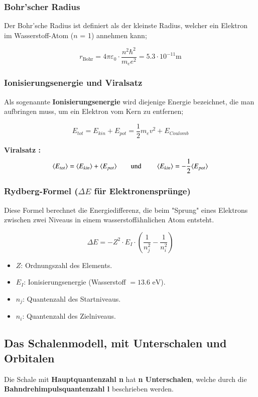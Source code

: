 \subsubsection{Bohr'scher Radius}
Der Bohr’sche Radius ist definiert als der kleinste Radius, welcher ein Elektron im
Wasserstoff-Atom ($n$ = 1) annehmen kann;

$$r_{\text{Bohr}} = 4\pi\varepsilon_0\cdot\frac{n^2 \hbar^{2}}{m_{e}e^{2}} = 5.3\cdot10^{-11}\text{m}$$

\subsubsection{Ionisierungsenergie und Viralsatz}
Als sogenannte \textbf{Ionisierungsenergie} wird diejenige Energie bezeichnet, die man aufbringen
muss, um ein Elektron vom Kern zu entfernen;

$$E_{tot} = E_{kin} + E_{pot} = \frac{1}{2}m_{e}v^{2} + E_{Coulomb}$$

\textbf{Viralsatz :}
$$\langle E_{tot}\rangle = \langle E_{kin}\rangle + \langle E_{pot}\rangle  \text{\qquad und \qquad} \langle E_{kin}\rangle = - \frac{1}{2}\langle E_{pot}\rangle$$

\subsubsection{Rydberg-Formel ($\Delta E$ für Elektronensprünge)}
Diese Formel berechnet die Energiedifferenz, die beim "Sprung" eines Elektrons zwischen zwei Niveaus in einem wasserstoffähnlichen Atom entsteht.

\begin{minipage}{0.35\columnwidth}
	$$\Delta E = -Z^2 \cdot E_I \cdot \left(\frac{1}{n_j^2} - \frac{1}{n_i^2}\right)$$
\end{minipage}
\hfill
\begin{minipage}{0.63\columnwidth}
	\begin{itemize}
    \item $Z$: Ordnungszahl des Elements.
    \item $E_I$: Ionisierungsenergie (Wasserstoff $= 13.6 \text{ eV}$).
    \item $n_j$: Quantenzahl des Startniveaus.
    \item $n_i$: Quantenzahl des Zielniveaus.
\end{itemize}
\end{minipage}

\subsection{Das Schalenmodell, mit Unterschalen und Orbitalen}
Die Schale mit \textbf{Hauptquantenzahl n} hat \textbf{n Unterschalen}, welche durch die \textbf{Bahndrehimpulsquantenzahl l} beschrieben werden.


